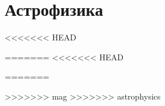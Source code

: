 \section{Астрофизика}
<<<<<<< HEAD

=======
<<<<<<< HEAD


=======

>>>>>>> mag
>>>>>>> astrophysics
